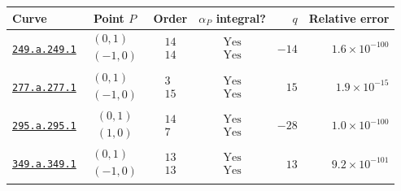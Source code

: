 \begin{table}[htbp]
\centering\scriptsize
\setlength{\tabcolsep}{3pt}
\renewcommand{\arraystretch}{1.3}
\begin{tabular}{@{}lcccrr@{}}
\toprule
Curve & Point $P$ & Order & $\alpha_P$ integral? & $q$ & Relative error \\
\midrule
\href{https://www.lmfdb.org/Genus2Curve/Q/249/a/249/1}{\texttt{249.a.249.1}} & $\begin{gathered}(0,1)\\(-1,0)\end{gathered}$ & $\begin{gathered}14\\14\end{gathered}$ & $\begin{gathered}\mathrm{Yes}\\\mathrm{Yes}\end{gathered}$ & $-14$ & $1.6\times 10^{-100}$ \\
\href{https://www.lmfdb.org/Genus2Curve/Q/277/a/277/1}{\texttt{277.a.277.1}} & $\begin{gathered}(0,1)\\(-1,0)\end{gathered}$ & $\begin{gathered}3\\15\end{gathered}$ & $\begin{gathered}\mathrm{Yes}\\\mathrm{Yes}\end{gathered}$ & $15$ & $1.9\times 10^{-15}$ \\
\href{https://www.lmfdb.org/Genus2Curve/Q/295/a/295/1}{\texttt{295.a.295.1}} & $\begin{gathered}(0,1)\\(1,0)\end{gathered}$ & $\begin{gathered}14\\7\end{gathered}$ & $\begin{gathered}\mathrm{Yes}\\\mathrm{Yes}\end{gathered}$ & $-28$ & $1.0\times 10^{-100}$ \\
\href{https://www.lmfdb.org/Genus2Curve/Q/349/a/349/1}{\texttt{349.a.349.1}} & $\begin{gathered}(0,1)\\(-1,0)\end{gathered}$ & $\begin{gathered}13\\13\end{gathered}$ & $\begin{gathered}\mathrm{Yes}\\\mathrm{Yes}\end{gathered}$ & $13$ & $9.2\times 10^{-101}$ \\

\end{tabular}
\end{table}
